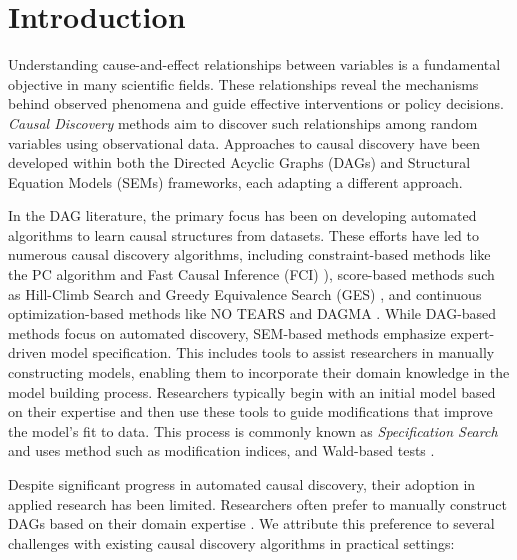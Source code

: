 \documentclass{uai2025} %
\begin{document}
\begin{abstract}
\end{abstract}

\section{Introduction}
Understanding cause-and-effect relationships between variables is a fundamental
objective in many scientific fields. These relationships reveal the mechanisms
behind observed phenomena and guide effective interventions or policy
decisions. \emph{Causal Discovery} methods aim to discover such relationships
among random variables using observational data. Approaches to causal discovery
have been developed within both the Directed Acyclic Graphs (DAGs) and
Structural Equation Models (SEMs) frameworks, each adapting a different
approach.

In the DAG literature, the primary focus has been on developing automated
algorithms to learn causal structures from datasets. These efforts have led to
numerous causal discovery algorithms, including constraint-based methods like
the PC algorithm \citep{Spirtes2001} and Fast Causal Inference (FCI)
\citep{Spirtes2000}), score-based methods such as Hill-Climb Search and Greedy
Equivalence Search (GES) \citep{Chickering2002}, and continuous
optimization-based methods like NO TEARS \citep{Zheng2018} and DAGMA
\citep{Bello2022}. While DAG-based methods focus on automated discovery,
SEM-based methods emphasize expert-driven model specification. This includes
tools to assist researchers in manually constructing models, enabling them to
incorporate their domain knowledge in the model building process. Researchers
typically begin with an initial model based on their expertise and then use
these tools to guide modifications that improve the model's fit to data. This
process is commonly known as \emph{Specification Search} \citep{Long1983} and
uses method such as modification indices, and Wald-based tests
\citep{Marcoulides2018}. 

Despite significant progress in automated causal discovery, their adoption in
applied research has been limited. Researchers often prefer to manually
construct DAGs based on their domain expertise \citep{Tennant2020,
Petersen2021}. We attribute this preference to several challenges with existing
causal discovery algorithms in practical settings:
\end{document}
